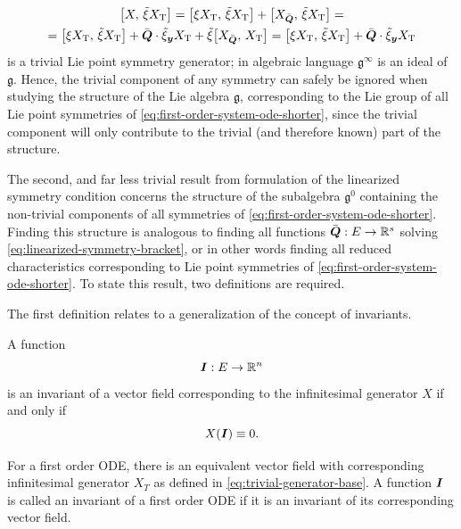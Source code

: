 \begin{multline*}
  \comm{X}{\tilde{\xi} X_{\text{T}}} =
  \comm{\xi X_{\text{T}}}{\tilde{\xi} X_{\text{T}}} + \comm{X_{\bar{\vect{Q}}}}{\tilde{\xi} X_{\text{T}}} =\\
  = \comm{\xi X_{\text{T}}}{\tilde{\xi} X_{\text{T}}} + \bar{\vect{Q}} \cdot \tilde{\xi}_{\vect{y}} X_{\text{T}} + \tilde{\xi} \comm{X_{\bar{\vect{Q}}}}{X_{\text{T}}} =
  \comm{\xi X_{\text{T}}}{\tilde{\xi} X_{\text{T}}} + \bar{\vect{Q}} \cdot \tilde{\xi}_{\vect{y}} X_{\text{T}}
\end{multline*}
is a trivial Lie point symmetry generator; in algebraic language \(\mathfrak{g}^\infty\) is an ideal of \(\mathfrak{g}\).
Hence, the trivial component of any symmetry can safely be ignored when studying the structure of the Lie algebra \(\mathfrak{g}\), corresponding to the Lie group of all Lie point symmetries of \cref{eq:first-order-system-ode-shorter}, since the trivial component will only contribute to the trivial (and therefore known) part of the structure.

The second, and far less trivial result from formulation  of the linearized symmetry condition concerns the structure of the subalgebra \(\mathfrak{g}^0\) containing the non-trivial components of all symmetries of \cref{eq:first-order-system-ode-shorter}.
Finding this structure is analogous to finding all functions \(\bar{\boldsymbol{Q}}: E \to \mathbb{R}^s\) solving \cref{eq:linearized-symmetry-bracket}, or in other words finding all reduced characteristics corresponding to Lie point symmetries of \cref{eq:first-order-system-ode-shorter}.
To state this result, two definitions are required.

The first definition relates to a generalization of the concept of invariants.
\begin{defn}
  A function
  \begin{equation*}
    \boldsymbol{I}: E \to \mathbb{R}^n
  \end{equation*}
  is an invariant of a vector field corresponding to the infinitesimal generator \(X\) if and only if
  \begin{equation*}
    X(\boldsymbol{I}) \equiv 0.
  \end{equation*}
\end{defn}
For a first order ODE, there is an equivalent vector field with corresponding infinitesimal generator \(X_T\) as defined in \cref{eq:trivial-generator-base}.
A function \(\boldsymbol{I}\) is called an invariant of a first order ODE if it is an invariant of its corresponding vector field.

